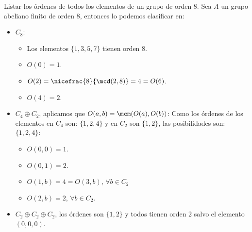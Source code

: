\begin{ejemplo} %
    Listar los órdenes de todos los elementos de un grupo de orden 8.
    Sea $A$ un grupo abeliano finito de orden $8$, entonces lo podemos clasificar en:
    \begin{itemize}
        \item $C_8$:
            \begin{itemize}
                \item Los elementos $\{1,3,5,7\}$ tienen orden 8.
                \item $O(0) = 1$.
                \item $O(2) = \nicefrac{8}{\mcd(2,8)} = 4 = O(6)$.
                \item $O(4) = 2$.
            \end{itemize}
        \item $C_4\oplus C_2$, aplicamos que $O(a,b) = \mcm(O(a), O(b))$:
            Como los órdenes de los elementos en $C_4$ son: $\{1,2,4\}$ y en $C_2$ son $\{1,2\}$, las posibilidades son: $\{1,2,4\}$:
            \begin{itemize}
                \item $O(0,0) = 1$.
                \item $O(0,1) = 2$.
                \item $O(1,b) = 4 = O(3,b)$, $\forall b\in C_2$
                \item $O(2,b) = 2 $, $\forall b\in C_2$.
            \end{itemize}
        \item $C_2\oplus C_2\oplus C_2$, los órdenes son $\{1,2\}$ y todos tienen orden 2 salvo el elemento $(0,0,0)$.
    \end{itemize}
\end{ejemplo}
